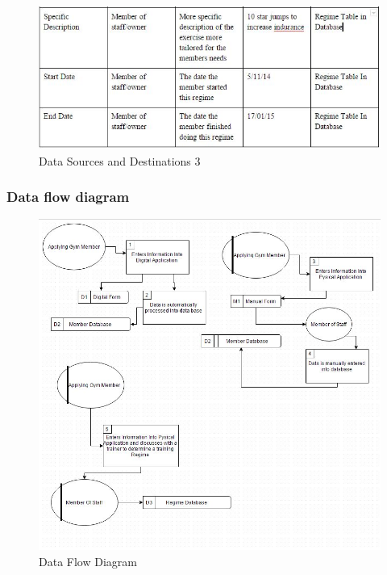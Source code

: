 \begin{figure}[H]
    \includegraphics[width=\textwidth]{New Proposed Sources 3.JPG}
    \caption{Data Sources and Destinations 3} \label{fig: Data Sources and Destinations 3 }
\end{figure}

\subsubsection{Data flow diagram}

\begin{figure}[H]
    \includegraphics[width=\textwidth]{ProposedDFD.JPG}
    \caption{Data Flow Diagram} \label{fig: Data Flow Diagram }
\end{figure}

